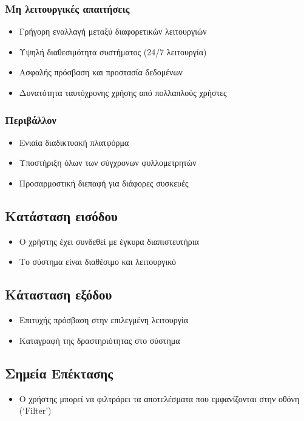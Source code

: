 \documentclass[12pt,a4paper,twoside]{book}
\begin{document}
\subsubsection{Μη λειτουργικές απαιτήσεις}
\begin{itemize}
  \item Γρήγορη εναλλαγή μεταξύ διαφορετικών λειτουργιών %
  \item Υψηλή διαθεσιμότητα συστήματος (24/7 λειτουργία) %
  \item Ασφαλής πρόσβαση και προστασία δεδομένων %
  \item Δυνατότητα ταυτόχρονης χρήσης από πολλαπλούς χρήστες
\end{itemize}

\subsubsection{Περιβάλλον}
\begin{itemize}
  \item Ενιαία διαδικτυακή πλατφόρμα %
  \item Υποστήριξη όλων των σύγχρονων φυλλομετρητών
  \item Προσαρμοστική διεπαφή για διάφορες συσκευές %
\end{itemize}

\subsection{Κατάσταση εισόδου} %
\begin{itemize}
  \item Ο χρήστης έχει συνδεθεί με έγκυρα διαπιστευτήρια %
  \item Το σύστημα είναι διαθέσιμο και λειτουργικό %
\end{itemize}

\subsection{Κάτασταση εξόδου} %
\begin{itemize}
  \item Επιτυχής πρόσβαση στην επιλεγμένη λειτουργία
  \item Καταγραφή της δραστηριότητας στο σύστημα %
\end{itemize}

\subsection{Σημεία Επέκτασης}
\begin{itemize}
  \item Ο χρήστης μπορεί να φιλτράρει τα αποτελέσματα που εμφανίζονται στην οθόνη (`Filter') %
\end{itemize}
\end{document}
